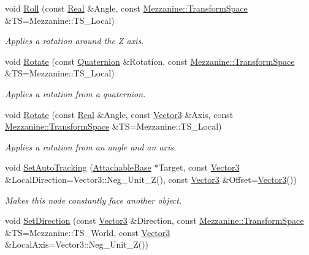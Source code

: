 \begin{DoxyCompactItemize}
void \hyperlink{classMezzanine_1_1WorldNode_acfcae16b95b2a9978ff56567af01e0df}{Roll} (const \hyperlink{namespaceMezzanine_a726731b1a7df72bf3583e4a97282c6f6}{Real} \&Angle, const \hyperlink{namespaceMezzanine_ad81c74de3529f1e643bd145173924ed3}{Mezzanine::TransformSpace} \&TS=Mezzanine::TS\_\-Local)
\begin{DoxyCompactList}\small\item\em Applies a rotation around the Z axis. \item\end{DoxyCompactList}\item 
void \hyperlink{classMezzanine_1_1WorldNode_a62f367c6b799f4b8216a72f39f568d35}{Rotate} (const \hyperlink{classMezzanine_1_1Quaternion}{Quaternion} \&Rotation, const \hyperlink{namespaceMezzanine_ad81c74de3529f1e643bd145173924ed3}{Mezzanine::TransformSpace} \&TS=Mezzanine::TS\_\-Local)
\begin{DoxyCompactList}\small\item\em Applies a rotation from a quaternion. \item\end{DoxyCompactList}\item 
void \hyperlink{classMezzanine_1_1WorldNode_aa9d52b9b88c9005524bc97187125fc43}{Rotate} (const \hyperlink{namespaceMezzanine_a726731b1a7df72bf3583e4a97282c6f6}{Real} \&Angle, const \hyperlink{classMezzanine_1_1Vector3}{Vector3} \&Axis, const \hyperlink{namespaceMezzanine_ad81c74de3529f1e643bd145173924ed3}{Mezzanine::TransformSpace} \&TS=Mezzanine::TS\_\-Local)
\begin{DoxyCompactList}\small\item\em Applies a rotation from an angle and an axis. \item\end{DoxyCompactList}\item 
void \hyperlink{classMezzanine_1_1WorldNode_a417e459d58c4d612bcbbe98a328c7b50}{SetAutoTracking} (\hyperlink{classMezzanine_1_1AttachableBase}{AttachableBase} $\ast$Target, const \hyperlink{classMezzanine_1_1Vector3}{Vector3} \&LocalDirection=Vector3::Neg\_\-Unit\_\-Z(), const \hyperlink{classMezzanine_1_1Vector3}{Vector3} \&Offset=\hyperlink{classMezzanine_1_1Vector3}{Vector3}())
\begin{DoxyCompactList}\small\item\em Makes this node constantly face another object. \item\end{DoxyCompactList}\item 
void \hyperlink{classMezzanine_1_1WorldNode_ab088981b0bea9d73e9bfaac5f237abc8}{SetDirection} (const \hyperlink{classMezzanine_1_1Vector3}{Vector3} \&Direction, const \hyperlink{namespaceMezzanine_ad81c74de3529f1e643bd145173924ed3}{Mezzanine::TransformSpace} \&TS=Mezzanine::TS\_\-World, const \hyperlink{classMezzanine_1_1Vector3}{Vector3} \&LocalAxis=Vector3::Neg\_\-Unit\_\-Z())

\end{DoxyCompactItemize}
